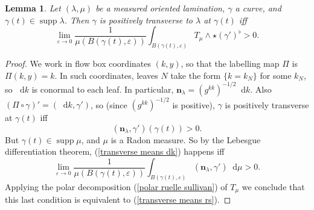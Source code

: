 \documentclass[reqno,10pt]{amsart}
\newcommand*\dif{\mathop{}\!\mathrm{d}}
\DeclareMathOperator{\supp}{supp}
\newcommand{\normal}{\mathbf n}
\newtheorem{lemma}[theorem]{Lemma}
\theoremstyle{definition}
\numberwithin{equation}{section}
\begin{document}
\begin{lemma}
Let $(\lambda, \mu)$ be a measured oriented lamination, $\gamma$ a curve, and $\gamma(t) \in \supp \lambda$.
Then $\gamma$ is positively transverse to $\lambda$ at $\gamma(t)$ iff
\begin{equation}\label{transverse means rs}
\lim_{\varepsilon \to 0} \frac{1}{\mu(B(\gamma(t), \varepsilon))} \int_{B(\gamma(t), \varepsilon)} T_\mu \wedge \star (\gamma')^\flat > 0.
\end{equation}
\end{lemma}
\begin{proof}
We work in flow box coordinates $(k, y)$, so that the labelling map $\Pi$ is $\Pi(k, y) = k$.
In such coordinates, leaves $N$ take the form $\{k = k_N\}$ for some $k_N$, so $\dif k$ is conormal to each leaf.
In particular, $\normal_\lambda = (g^{kk})^{-1/2} \dif k$.
Also $(\Pi \circ \gamma)' = (\dif k, \gamma')$, so (since $(g^{kk})^{-1/2}$ is positive), $\gamma$ is positively transverse at $\gamma(t)$ iff
\begin{equation}\label{transverse means dk}
(\normal_\lambda, \gamma')(\gamma(t)) > 0.
\end{equation}
But $\gamma(t) \in \supp \mu$, and $\mu$ is a Radon measure.
So by the Lebesgue differentiation theorem, (\ref{transverse means dk}) happens iff
$$\lim_{\varepsilon \to 0} \frac{1}{\mu(B(\gamma(t), \varepsilon))} \int_{B(\gamma(t), \varepsilon)} (\normal_\lambda, \gamma') \dif \mu > 0.$$
Applying the polar decomposition (\ref{polar ruelle sullivan}) of $T_\mu$ we conclude that this last condition is equivalent to (\ref{transverse means rs}).
\end{proof}
\end{document}
